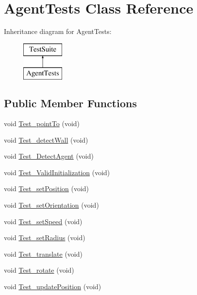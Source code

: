 \hypertarget{classAgentTests}{\section{Agent\-Tests Class Reference}
\label{classAgentTests}
}
Inheritance diagram for Agent\-Tests\-:\begin{figure}[H]
\begin{center}
\leavevmode
\includegraphics[height=2.000000cm]{classAgentTests}
\end{center}
\end{figure}
\subsection*{Public Member Functions}
\begin{DoxyCompactItemize}
\item 
void \hyperlink{classAgentTests_aa1916eb6d1959cbcff228f754d867a7a}{Test\-\_\-point\-To} (void)
\item 
void \hyperlink{classAgentTests_a66770690a4935c28827b07e9af99c6b0}{Test\-\_\-detect\-Wall} (void)
\item 
void \hyperlink{classAgentTests_a8893a3644afd6f018ea7c79151f2b9bb}{Test\-\_\-\-Detect\-Agent} (void)
\item 
void \hyperlink{classAgentTests_a5d65e90adfcccdc486a7c4e115ca8551}{Test\-\_\-\-Valid\-Initialization} (void)
\item 
void \hyperlink{classAgentTests_a79e72db600ce8f14e0f09a66d64ff1c0}{Test\-\_\-set\-Position} (void)
\item 
void \hyperlink{classAgentTests_a68bb8b102aa21b1841d7092ef34af4e9}{Test\-\_\-set\-Orientation} (void)
\item 
void \hyperlink{classAgentTests_ae52314b8f6bf850ab42905c5beeb4ddb}{Test\-\_\-set\-Speed} (void)
\item 
void \hyperlink{classAgentTests_aae3a3dee04a28d74fdd879f9ce965e3e}{Test\-\_\-set\-Radius} (void)
\item 
void \hyperlink{classAgentTests_a3ae988bf6d1f75e02296dcf99fc4ed31}{Test\-\_\-translate} (void)
\item 
void \hyperlink{classAgentTests_aba2962f44be5d40c14f146d878c56ed3}{Test\-\_\-rotate} (void)
\item 
void \hyperlink{classAgentTests_a50efe314bfeb1965d13a5a71eec8e703}{Test\-\_\-update\-Position} (void)
\end{DoxyCompactItemize}


